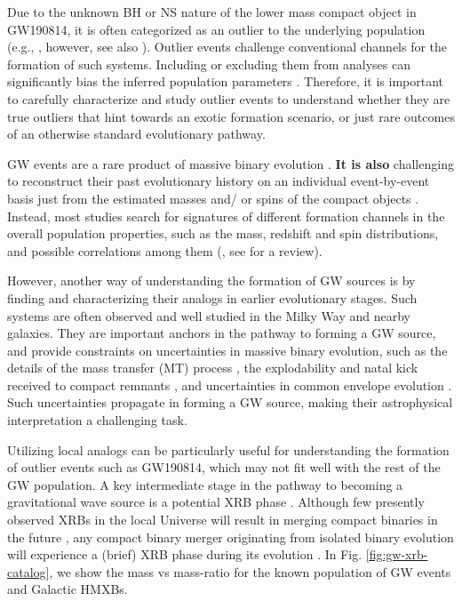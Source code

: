 \documentclass[linenumbers,trackchanges,twocolumn]{aastex701}
\begin{document}
Due to the unknown BH or NS nature of the lower mass compact object in GW190814, it is often categorized as an outlier to the underlying population (e.g., \citealp{2021ApJ...913L...7A,2022ApJ...926...34E}, however, see also \citealp{2022ApJ...931..108F}). Outlier events challenge conventional channels for the formation of such systems. Including or excluding them from analyses can significantly bias the inferred population parameters \citep[e.g.,][]{2025arXiv250814159C}. Therefore, it is important to carefully characterize and study outlier events to understand whether they are true outliers that hint towards an exotic formation scenario, or just rare outcomes of an otherwise standard evolutionary pathway.

GW events are a rare product of massive binary evolution  \textbf{\citep[e.g.,][]{2018MNRAS.480.2011G, 2018A&A...619A..77K, 2019MNRAS.490.3740N, 2022MNRAS.516.5737B, 2023MNRAS.524..426I, 2025ApJ...979..209V}}. \textbf{It is also} challenging to reconstruct their past evolutionary history on an individual event-by-event basis just from the estimated masses and/ or spins of the compact objects \citep[e.g.,][]{2023ApJ...950..181W}. Instead, most studies search for signatures of different formation channels in the overall population properties, such as the mass, redshift and spin distributions, and possible correlations among them (\citealp{2022ApJ...940..184V}, see \citealp{2024arXiv241019145C} for a review).

However, another way of understanding the formation of GW sources is by finding and characterizing their analogs in earlier evolutionary stages. Such systems are often observed and well studied in the Milky Way and nearby galaxies. They are important anchors in the pathway to forming a GW source, and provide constraints on uncertainties in massive binary evolution, such as the details of the mass transfer (MT) process \textbf{\citep[e.g.,][]{2016ApJ...833..108S, 2024A&A...691A.174S, 2025A&A...695A.117N, 2025arXiv251115347S}}, the explodability and natal kick received to compact remnants \citep[e.g.,][]{2024PhRvL.132s1403V}, and uncertainties in common envelope evolution \textbf{\citep[e.g.,][]{2020MNRAS.492.3229H}}. Such uncertainties propagate in forming a GW source, making their astrophysical interpretation a challenging task.

Utilizing local analogs can be particularly useful for understanding the formation of outlier events such as GW190814, which may not fit well with the rest of the GW population. A key intermediate stage in the pathway to becoming a gravitational wave source is a potential XRB phase \citep[e.g.,][]{2021A&A...652A.138S}. Although few presently observed XRBs in the local Universe will result in merging compact binaries in the future \textbf{\citep[e.g.,][]{2022ApJ...929L..26F,2022ApJ...938L..19G, 2024A&A...690A..21B}}, any compact binary merger originating from isolated binary evolution will experience a (brief) XRB phase during its evolution \citep[e.g.,][]{2020A&A...638A..39L}. In Fig. \ref{fig:gw-xrb-catalog}, we show the mass vs mass-ratio for the known population of GW events and Galactic HMXBs.
\end{document}
